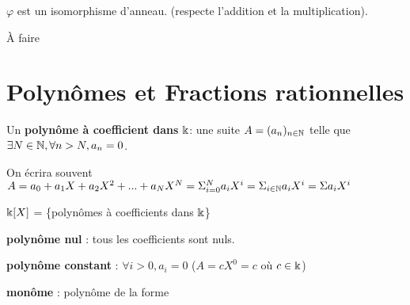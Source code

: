\documentclass[a4paper, 12pt]{article}
\begin{document}











\begin{remark}
    $\varphi$ est un isomorphisme d'anneau. (respecte l'addition et la multiplication).
\end{remark}

\begin{methode}
    À faire
\end{methode}

\section{Polynômes et Fractions rationnelles}

\begin{definition}
    Un \textbf{polynôme à coefficient dans} $\Bbbk$: une suite $A = (a_n)_{n \in \mathbb{N}}$
    telle que $\exists N \in \mathbb{N}, \forall n > N, a_n = 0$.

    On écrira souvent $A = a_0 + a_1X + a_2X^2 + ... + a_NX^N = \Sigma_{i=0}^N a_iX^i = \Sigma_{i \in \mathbb{N}} a_iX^i = \Sigma a_iX^i$

    \item $\Bbbk[X]$ = \{polynômes à coefficients dans $\Bbbk$\}
    \item \textbf{polynôme nul} : tous les coefficients sont nuls.
    \item \textbf{polynôme constant} : $\forall i \gt 0, a_i = 0$ ($A = cX^0 = c$ où $c \in \Bbbk$)
    \item \textbf{monôme} : polynôme de la forme %
\end{definition}
\end{document}
